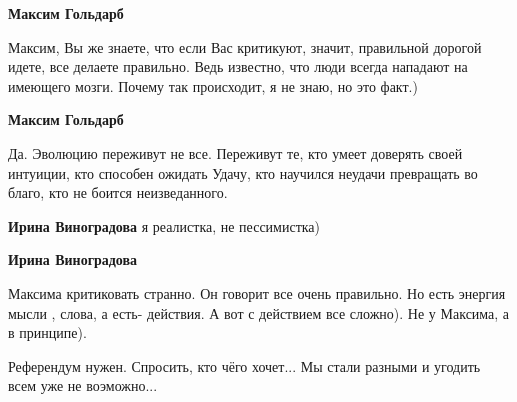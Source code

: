 \begin{itemize}
\begin{itemize}
\textbf{Максим Гольдарб} 

Максим, Вы же знаете, что если Вас критикуют, значит, правильной дорогой идете,
все делаете правильно. Ведь известно, что люди всегда нападают на имеющего
мозги. Почему так происходит, я не знаю, но это факт.)


 
\textbf{Максим Гольдарб} 

Да. Эволюцию переживут не все. Переживут те, кто умеет доверять своей интуиции,
кто способен ожидать Удачу, кто научился неудачи превращать во благо, кто не
боится неизведанного.


 
\textbf{Ирина Виноградова} я реалистка, не пессимистка)

 
\textbf{Ирина Виноградова} 

Максима критиковать странно. Он говорит все очень
правильно. Но есть энергия мысли , слова, а есть- действия. А вот с действием
все сложно). Не у Максима, а в принципе).

\end{itemize}


Референдум нужен. Спросить, кто чёго хочет... Мы стали разными и угодить всем
уже не воэможно...

\begin{itemize}
 

\end{itemize}
\end{itemize}
